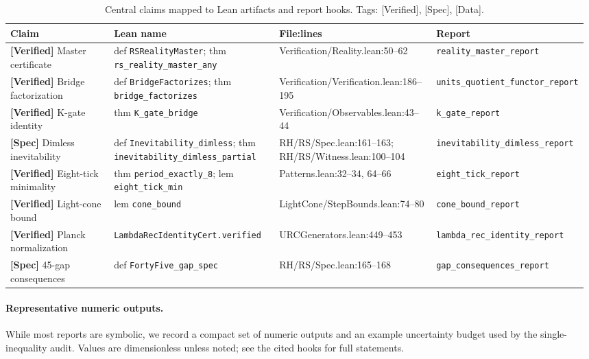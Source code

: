\documentclass[11pt,a4paper,twoside]{article}
\numberwithin{equation}{section}
\theoremstyle{customthm}
\theoremstyle{customdef}
\theoremstyle{customrem}
\begin{document}
\begin{table}[t]
\centering
\small
\caption{Central claims mapped to Lean artifacts and report hooks. Tags: [Verified], [Spec], [Data].}
\begin{tabular}{@{}p{0.24\linewidth} p{0.30\linewidth} p{0.28\linewidth} p{0.16\linewidth}@{}}
\toprule
\textbf{Claim} & \textbf{Lean name} & \textbf{File:lines} & \textbf{Report} \\
\midrule
\textbf{[Verified]} Master certificate & def \texttt{RSRealityMaster}; thm \texttt{rs\_reality\_master\_any} & Verification/Reality.lean:50--62 & \texttt{reality\_master\_report} \\
\textbf{[Verified]} Bridge factorization & def \texttt{BridgeFactorizes}; thm \texttt{bridge\_factorizes} & Verification/Verification.lean:186--195 & \texttt{units\_quotient\_functor\_report} \\
\textbf{[Verified]} K-gate identity & thm \texttt{K\_gate\_bridge} & Verification/Observables.lean:43--44 & \texttt{k\_gate\_report} \\
\textbf{[Spec]} Dimless inevitability & def \texttt{Inevitability\_dimless}; thm \texttt{inevitability\_dimless\_partial} & RH/RS/Spec.lean:161--163; RH/RS/Witness.lean:100--104 & \texttt{inevitability\_dimless\_report} \\
\textbf{[Verified]} Eight-tick minimality & thm \texttt{period\_exactly\_8}; lem \texttt{eight\_tick\_min} & Patterns.lean:32--34, 64--66 & \texttt{eight\_tick\_report} \\
\textbf{[Verified]} Light-cone bound & lem \texttt{cone\_bound} & LightCone/StepBounds.lean:74--80 & \texttt{cone\_bound\_report} \\
\textbf{[Verified]} Planck normalization & \texttt{LambdaRecIdentityCert.verified} & URCGenerators.lean:449--453 & \texttt{lambda\_rec\_identity\_report} \\
\textbf{[Spec]} 45-gap consequences & def \texttt{FortyFive\_gap\_spec} & RH/RS/Spec.lean:165--168 & \texttt{gap\_consequences\_report} \\
\bottomrule
\end{tabular}
\end{table}

\paragraph{Representative numeric outputs.} While most reports are symbolic, we record a compact set of numeric outputs and an example uncertainty budget used by the single-inequality audit. Values are dimensionless unless noted; see the cited hooks for full statements.
\end{document}
